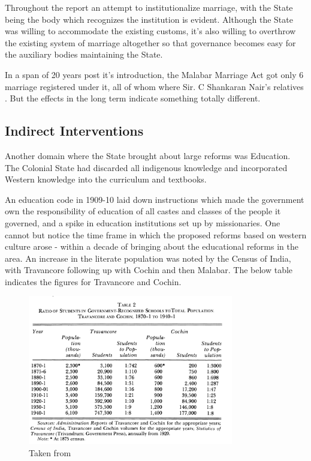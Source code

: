 \documentclass[a4paper]{article}
\begin{document}
Throughout the report an attempt to
institutionalize marriage, with the State being
the body which recognizes the institution is
evident. Although the State was willing to accommodate the
existing customs, it's also willing to overthrow
the existing system of marriage altogether so that
governance becomes easy for the auxiliary bodies
maintaining the State.

In a span of 20 years post it's introduction, the
Malabar Marriage Act got only 6 marriage
registered under it, all of whom where Sir. C
Shankaran Nair's relatives
\cite{panikkar1918some}. But the effects in the
long term indicate something totally different.

\subsection{Indirect Interventions}

Another domain where the State brought about large
reforms was Education. The Colonial State had
discarded all indigenous knowledge and
incorporated Western knowledge into the curriculum
and textbooks. 

An education code in
1909-10\cite{jeffrey1987governments} laid down
instructions which made the government own the
responsibility of education of all castes and
classes of the people it governed, and a spike in
education institutions set up by missionaries. One
cannot but notice the time frame in which the
proposed reforms based on western culture arose -
within a decade of bringing about the educational
reforms in the area. An increase in the literate
population was noted by the Census of India, with
Travancore following up with Cochin and then
Malabar. The below table indicates the figures for
Travancore and Cochin.

\begin{figure}[!ht]
    \begin{center}
        \includegraphics[width=0.8\textwidth]{education_table}
        \caption{Taken from \cite{jeffrey1987governments}}
    \end{center}
\end{figure}
\end{document}

